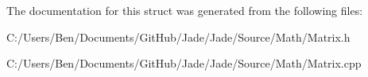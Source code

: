 The documentation for this struct was generated from the following files\+:\begin{DoxyCompactItemize}
\item 
C\+:/\+Users/\+Ben/\+Documents/\+Git\+Hub/\+Jade/\+Jade/\+Source/\+Math/Matrix.\+h\item 
C\+:/\+Users/\+Ben/\+Documents/\+Git\+Hub/\+Jade/\+Jade/\+Source/\+Math/Matrix.\+cpp\end{DoxyCompactItemize}
